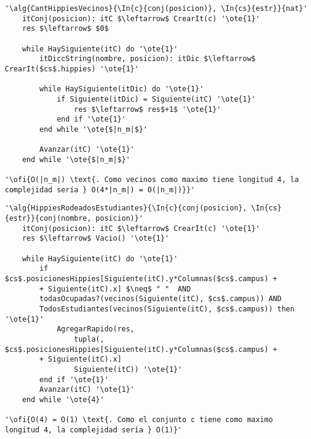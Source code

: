 \begin{lstlisting}[mathescape]
'\alg{CantHippiesVecinos}{\In{c}{conj(posicion)}, \In{cs}{estr}}{nat}'
	itConj(posicion): itC $\leftarrow$ CrearIt(c) '\ote{1}'
	res $\leftarrow$ $0$

	while HaySiguiente(itC) do '\ote{1}'
		itDiccString(nombre, posicion): itDic $\leftarrow$ CrearIt($cs$.hippies) '\ote{1}'

		while HaySiguiente(itDic) do '\ote{1}'
			if Siguiente(itDic) = Siguiente(itC) '\ote{1}'
				res $\leftarrow$ res$+1$ '\ote{1}'
			end if '\ote{1}'
		end while '\ote{$|n_m|$}'

		Avanzar(itC) '\ote{1}'
	end while '\ote{$|n_m|$}'

'\ofi{O(|n_m|) \text{. Como vecinos como maximo tiene longitud 4, la complejidad sería } O(4*|n_m|) = O(|n_m|)}}'
\end{lstlisting}

\begin{lstlisting}[mathescape]
'\alg{HippiesRodeadosEstudiantes}{\In{c}{conj(posicion}, \In{cs}{estr}}{conj(nombre, posicion)}'
	itConj(posicion): itC $\leftarrow$ CrearIt(c) '\ote{1}'
	res $\leftarrow$ Vacio() '\ote{1}'

	while HaySiguiente(itC) do '\ote{1}'
		if $cs$.posicionesHippies[Siguiente(itC).y*Columnas($cs$.campus) +
		+ Siguiente(itC).x] $\neq$ " "  AND
		todasOcupadas?(vecinos(Siguiente(itC), $cs$.campus)) AND
		TodosEstudiantes(vecinos(Siguiente(itC), $cs$.campus)) then '\ote{1}'
			AgregarRapido(res,
				tupla(, $cs$.posicionesHippies[Siguiente(itC).y*Columnas($cs$.campus) +
		+ Siguiente(itC).x]
				Siguiente(itC)) '\ote{1}'
		end if '\ote{1}'
		Avanzar(itC) '\ote{1}'
	end while '\ote{4}'

'\ofi{O(4) = O(1) \text{. Como el conjunto c tiene como maximo longitud 4, la complejidad sería } O(1)}'
\end{lstlisting}

